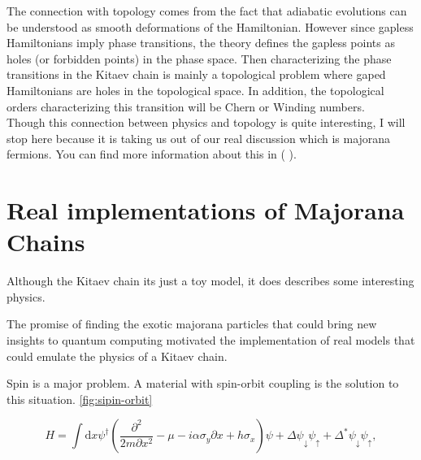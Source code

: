 The connection with topology comes from the fact that adiabatic evolutions can be understood as smooth deformations of the Hamiltonian. However since gapless Hamiltonians imply phase transitions, the theory defines the gapless points as holes (or forbidden points) in the phase space. Then characterizing the phase transitions in the Kitaev chain is mainly a topological problem where gaped Hamiltonians are holes in the topological space. In addition, the topological orders characterizing this transition will be Chern or Winding numbers. \\


Though this connection between physics and topology is quite interesting, I will stop here because it is taking us out of our real discussion which is majorana fermions.  You can find more information about this in ( ). 








\section{Real implementations of Majorana Chains}

Although the Kitaev chain its just a toy model, it does describes some interesting physics. 

The promise of finding the exotic majorana particles that could bring new insights to quantum computing motivated the implementation of real models that could emulate the physics of a Kitaev chain. 

Spin is a major problem. A material with spin-orbit coupling is  the solution to this situation. \ref{fig:sipin-orbit} 

\begin{equation}
    H =\int\mbox{d}x\psi^{\dagger}\left(\frac{\partial^{2}}{2m\partial x^{2}}-\mu -i\alpha\sigma_{y}\partial x+h\sigma_{x}\right)\psi+\Delta\psi_{\downarrow}\psi_{\uparrow}+\Delta^{*}\psi_{\downarrow}\psi_{\uparrow},
    \label{eq:MajoranaChainHam}
\end{equation}





